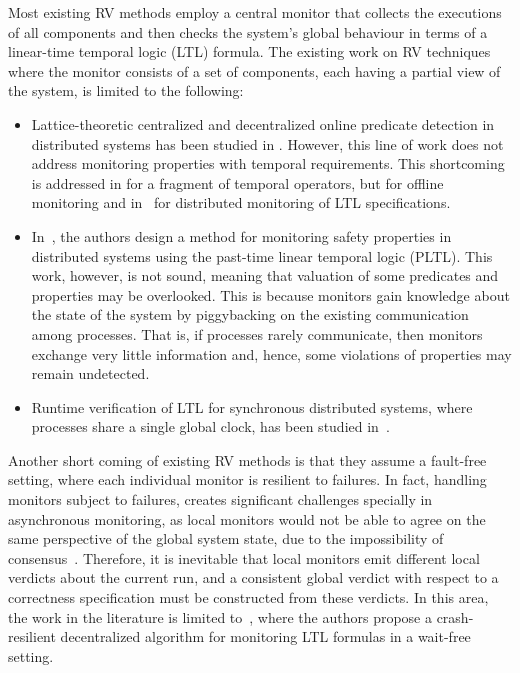 Most existing RV methods employ a central monitor that collects the executions 
of all components and then checks the system's global behaviour in terms of a 
linear-time temporal logic (LTL) formula. The existing work on RV techniques 
where the monitor consists of a set of components, each having a partial view 
of the system, is limited to the following:

\begin{itemize}
 \item Lattice-theoretic centralized and decentralized online
predicate 
detection in distributed systems has been studied
in \cite{cgnm13,mg05}. 
However, this line of work does not address
monitoring properties with temporal 
requirements.
This shortcoming is addressed in \cite{og07} for a fragment of
temporal operators, but for offline monitoring and in~\cite{mb15} for 
distributed monitoring of LTL specifications.

\item In~\cite{svar04}, the authors design a method for monitoring safety
properties in distributed systems using the past-time linear
temporal logic 
(PLTL). This work, however, is not sound,
meaning that valuation of some 
predicates and properties
 may be overlooked. This is because monitors gain 
knowledge
about the state of the system by piggybacking on
the existing 
communication among processes. That is, if
processes rarely communicate, then 
monitors exchange
very little information and, hence, some violations of
properties may remain undetected.

\item Runtime verification of LTL for synchronous distributed
systems, where 
processes share a single global clock, has
been studied in~\cite{bf16,cf16}.

\end{itemize}

Another short coming of existing RV methods is that they assume a fault-free 
setting, where each individual monitor is resilient to failures. In fact, 
handling monitors subject to failures, creates significant challenges specially 
in asynchronous monitoring, as local monitors would not be able to agree on the 
same perspective of the global system state, due to the impossibility of 
consensus~\cite{flp}. Therefore, it is inevitable that local monitors 
emit different local verdicts about the current run, and a consistent global 
verdict with respect to a correctness specification must be constructed from 
these verdicts. In this area, the work in the literature is limited 
to~\cite{bfrrt16}, where the authors propose a crash-resilient decentralized 
algorithm for monitoring LTL formulas in a wait-free setting.


